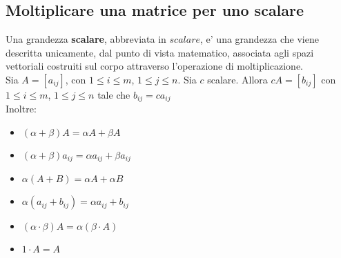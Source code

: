 \documentclass[a4paper, 10pt]{article}
\begin{document}
	\subsection{Moltiplicare una matrice per uno scalare}
	Una grandezza \textbf{scalare}, abbreviata in $scalare$, e' una grandezza che viene descritta unicamente,
	dal punto di vista 
	matematico, associata agli spazi vettoriali costruiti sul corpo attraverso l'operazione di moltiplicazione.
	\\
	Sia $A = [a_{ij}]$, con $1 \leq i \leq m$, $1 \leq j \leq n$. Sia $c$ scalare. Allora $cA = [b_{ij}]$ con 
	$1 \leq i \leq m$, 
	$1 \leq j \leq n$ tale che $b_{ij} = ca_{ij}$ \\
	Inoltre:
	\begin{itemize}
		\item $(\alpha + \beta) A = \alpha A + \beta A$
		\item $(\alpha + \beta) a_{ij} = \alpha a_{ij} + \beta a_{ij}$
		\item $\alpha (A + B) = \alpha A + \alpha B$
		\item $\alpha (a_{ij} + b_{ij}) = \alpha a_{ij} + b_{ij}$
		\item $(\alpha \cdot \beta ) A = \alpha (\beta \cdot A)$
		\item $1 \cdot A = A$
	\end{itemize}
	
\end{document}
